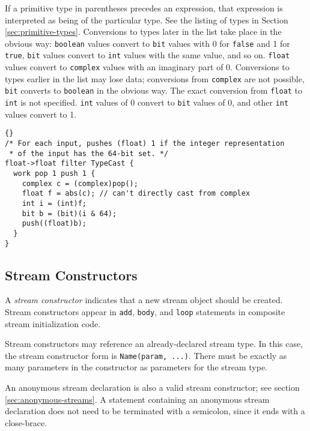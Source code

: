\documentclass[11pt]{article}
\begin{document}
If a primitive type in parentheses precedes an expression, that
expression is interpreted as being of the particular type.  See the
listing of types in Section \ref{sec:primitive-types}.  Conversions to
types later in the list take place in the obvious way:
\lstinline|boolean| values convert to \lstinline|bit| values with 0
for \lstinline|false| and 1 for \lstinline|true|, \lstinline|bit|
values convert to \lstinline|int| values with the same value, and so
on.  \lstinline|float| values convert to \lstinline|complex| values
with an imaginary part of 0.  Conversions to types earlier in the list
may lose data; conversions from \lstinline|complex| are not possible,
\lstinline|bit| converts to \lstinline|boolean| in the obvious way.
The exact conversion from \lstinline|float| to \lstinline|int| is not
specified.  \lstinline|int| values of 0 convert to \lstinline|bit|
values of 0, and other \lstinline|int| values convert to 1.

\begin{lstlisting}{}
/* For each input, pushes (float) 1 if the integer representation
 * of the input has the 64-bit set. */
float->float filter TypeCast {
  work pop 1 push 1 {
    complex c = (complex)pop();
    float f = abs(c); // can't directly cast from complex
    int i = (int)f;
    bit b = (bit)(i & 64);
    push((float)b);
  }
}
\end{lstlisting}

\subsection{Stream Constructors}
\label{sec:expr-stream-constructor}

A \emph{stream constructor} indicates that a new stream object should
be created.  Stream constructors appear in \lstinline|add|,
\lstinline|body|, and \lstinline|loop| statements in composite stream
initialization code.

Stream constructors may reference an already-declared stream type.  In
this case, the stream constructor form is \lstinline|Name(param, ...)|.
There must be exactly as many parameters in the constructor as
parameters for the stream type.  

An anonymous stream declaration is also a valid stream constructor;
see section \ref{sec:anonymous-streams}.  A statement containing an
anonymous stream declaration does not need to be terminated with a
semicolon, since it ends with a close-brace.
\end{document}
